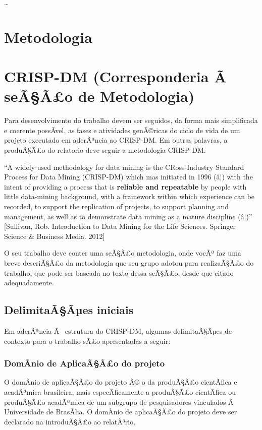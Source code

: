 \documentclass[]{article}
\begin{document}
\ldots{}

\section{Metodologia}\label{metodologia}

\section{CRISP-DM (Corresponderia Ã~ seÃ§Ã£o de
Metodologia)}\label{crisp-dm-corresponderia-a-seaao-de-metodologia}

Para desenvolvimento do trabalho devem ser seguidos, da forma mais
simplificada e coerente possÃ­vel, as fases e atividades genÃ©ricas do
ciclo de vida de um projeto executado em aderÃªncia ao CRISP-DM. Em
outras palavras, a produÃ§Ã£o do relatorio deve seguir a metodologia
CRISP-DM.

``A widely used methodology for data mining is the CRoss-Industry
Standard Process for Data Mining (CRISP-DM) which mas initiated in 1996
(â¦) with the intent of providing a process that is \textbf{reliable
and repeatable} by people with little data-mining background, with a
framework within which experience can be recorded, to support the
replication of projects, to support planning and management, as well as
to demonstrate data mining as a mature discipline (â¦)'' {[}Sullivan,
Rob. Introduction to Data Mining for the Life Sciences. Springer Science
\& Business Media. 2012{]}

O seu trabalho deve conter uma seÃ§Ã£o metodologia, onde vocÃª faz uma
breve descriÃ§Ã£o da metodologia que seu grupo adotou para realizaÃ§Ã£o
do trabalho, que pode ser baseada no texto dessa seÃ§Ã£o, desde que
citado adequadamente.

\subsection{DelimitaÃ§Ãµes iniciais}\label{delimitaaaes-iniciais}

Em aderÃªncia Ã~ estrutura do CRISP-DM, algumas delimitaÃ§Ãµes de
contexto para o trabalho sÃ£o apresentadas a seguir:

\subsubsection{DomÃ­nio de AplicaÃ§Ã£o do
projeto}\label{domanio-de-aplicaaao-do-projeto}

O domÃ­nio de aplicaÃ§Ã£o do projeto Ã© o da produÃ§Ã£o cientÃ­fica e
acadÃªmica brasileira, mais especÃ­ficamente a produÃ§Ã£o cientÃ­fica ou
produÃ§Ã£o acadÃªmica de um subgrupo de pesquisadores vinculados Ã~
Universidade de BrasÃ­lia. O domÃ­nio de aplicaÃ§Ã£o do projeto deve ser
declarado na introduÃ§Ã£o ao relatÃ³rio.
\end{document}
